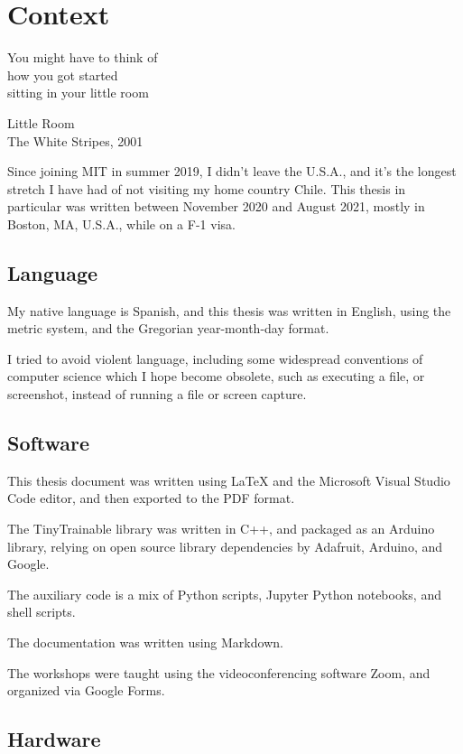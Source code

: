 \chapter{Context}

\epigraph{You might have to think  of \\ how you got started \\ sitting in your little room}{Little Room \\ The White Stripes, 2001}

Since joining MIT in summer 2019, I didn't leave the U.S.A., and it's the longest stretch I have had of not visiting my home country Chile. This thesis in particular was written between November 2020 and August 2021, mostly in Boston, MA, U.S.A., while on a F-1 visa.

\section{Language}

My native language is Spanish, and this thesis was written in English, using the metric system, and the Gregorian year-month-day format.

I tried to avoid violent language, including some widespread conventions of computer science which I hope become obsolete, such as executing a file, or screenshot, instead of running a file or screen capture.

\section{Software}

This thesis document was written using LaTeX and the Microsoft Visual Studio Code editor, and then exported to the PDF format.

The TinyTrainable library was written in C++, and packaged as an Arduino library, relying on open source library dependencies by Adafruit, Arduino, and Google.

The auxiliary code is a mix of Python scripts, Jupyter Python notebooks, and shell scripts.

The documentation was written using Markdown.

The workshops were taught using the videoconferencing software Zoom, and organized via Google Forms.

\section{Hardware}

